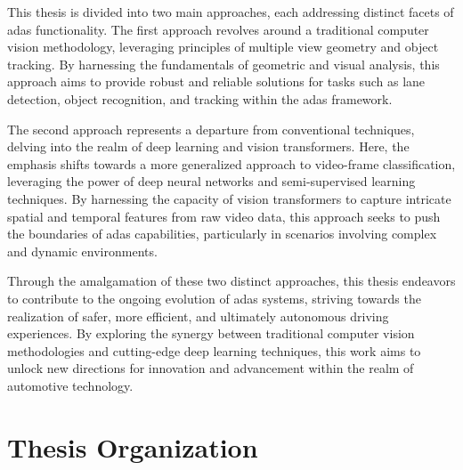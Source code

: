 This thesis is divided into two main approaches, each addressing distinct facets of \ac{adas} functionality.
The first approach revolves around a traditional computer vision methodology, leveraging principles of multiple view geometry and object tracking. 
By harnessing the fundamentals of geometric and visual analysis, this approach aims to provide robust and reliable solutions for tasks such as lane detection, object recognition, and tracking within the \ac{adas} framework.

The second approach represents a departure from conventional techniques, delving into the realm of deep learning and vision transformers. 
Here, the emphasis shifts towards a more generalized approach to video-frame classification, leveraging the power of deep neural networks and semi-supervised learning techniques. 
By harnessing the capacity of vision transformers to capture intricate spatial and temporal features from raw video data, this approach seeks to push the boundaries of \ac{adas} capabilities, particularly in scenarios involving complex and dynamic environments.

Through the amalgamation of these two distinct approaches, this thesis endeavors to contribute to the ongoing evolution of \ac{adas} systems, striving towards the realization of safer, more efficient, and ultimately autonomous driving experiences. 
By exploring the synergy between traditional computer vision methodologies and cutting-edge deep learning techniques, this work aims to unlock new directions for innovation and advancement within the realm of automotive technology.

\section{Thesis Organization}
\lipsum[1-2]

